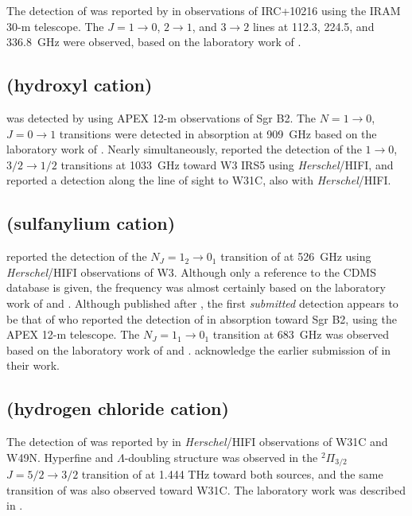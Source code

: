 \documentclass[twocolumn]{aastex631}
\begin{document}
    The detection of  was reported by \citet{Agundez:2010ks} in observations of IRC+10216 using the IRAM 30-m telescope.  The $J = 1\rightarrow0$, $2\rightarrow1$, and $3\rightarrow2$ lines at 112.3, 224.5, and 336.8~GHz were observed, based on the laboratory work of \citet{Amano:2008ij}.
    
    \subsection{ (hydroxyl cation)}
    \label{OH+}
    
     was detected by \citet{Wyrowski:2010eh} using APEX 12-m observations of Sgr B2.  The $N = 1\rightarrow0$, $J = 0\rightarrow1$ transitions were detected in absorption at 909~GHz based on the laboratory work of \citet{Bekooy:1985ku}.  Nearly simultaneously, \citet{Benz:2010ei} reported the detection of the $1\rightarrow0$, $3/2\rightarrow1/2$ transitions at 1033~GHz toward W3 IRS5 using \emph{Herschel}/HIFI, and \citet{Gerin:2010bg} reported a detection along the line of sight to W31C, also with \emph{Herschel}/HIFI.
    
    \subsection{ (sulfanylium cation)}
    \label{SH+}
    
    \citet{Benz:2010ei} reported the detection of the $N_J = 1_2\rightarrow0_1$ transition of  at 526~GHz using \emph{Herschel}/HIFI observations of W3. Although only a reference to the CDMS database is given, the frequency was almost certainly based on the laboratory work of \citet{Hovde:1987jn} and \citet{Brown:2009ee}. Although published after \citet{Benz:2010ei}, the first \emph{submitted} detection appears to be that of \citet{Menten:2011hk} who reported the detection of  in absorption toward Sgr B2, using the APEX 12-m telescope.  The $N_J = 1_1\rightarrow0_1$ transition at 683~GHz was observed based on the laboratory work of \citet{Hovde:1987jn} and \citet{Brown:2009ee}. \citet{Benz:2010ei} acknowledge the earlier submission of \citet{Menten:2011hk} in their work.
    
    \subsection{ (hydrogen chloride cation)}
    \label{HCl+}
    
    The detection of  was reported by \citet{DeLuca:2012cv} in \emph{Herschel}/HIFI observations of W31C and W49N.  Hyperfine and $\Lambda$-doubling structure was observed in the $^2\Pi_{3/2}$ $J = 5/2\rightarrow3/2$ transition of  at 1.444 THz toward both sources, and the same transition of  was also observed toward W31C.  The laboratory work was described in \citet{Gupta:2012ga}.
    
\end{document}
